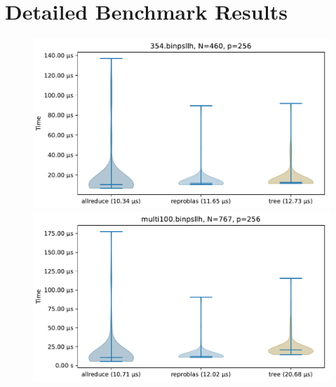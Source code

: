 \section{Detailed Benchmark Results}

\newcommand{\mScale}{0.7}
\begin{figure}\centering
\includegraphics[scale=\mScale]{figures/violin354.pdf}
\includegraphics[scale=\mScale]{figures/violinMulti100.pdf}

\end{figure}
